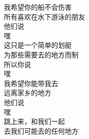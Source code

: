 \documentclass[12pt]{ctexart}
\begin{document}
\begin{paracol}{2}
		我希望你的船不会伤害\\
		所有喜欢在水下游泳的朋友\\
		他们说\\
		嘿\\
		
		这只是一个简单的划艇\\
		为那些需要去的地方而制\\
		所以你说\\
		嘿\\
		
		我希望你能带我去\\
		远离家乡的地方\\
		他们说\\
		嘿\\
		
		跳上来，和我们一起\\
		去我们可能去的任何地方\\
		
	\end{paracol}
	
\end{document}
